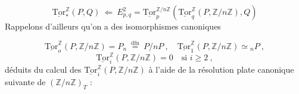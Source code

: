\begin{equation}\tag{2.1.4}
\underline{\mathrm{Tor}}^{\mathbb{Z}}_*(P,Q) \ \Longleftarrow \ E^2_{p,q} = \underline{\mathrm{Tor}}^{\mathbb{Z}/n\mathbb{Z}}_p(\underline{\mathrm{Tor}}^{\mathbb{Z}}_q(P,\mathbb{Z}/n\mathbb{Z}),Q)
\end{equation}
Rappelons d'ailleurs qu'on a des isomorphismes canoniques

\begin{equation*}
\underline{\mathrm{Tor}}^{\mathbb{Z}}_o(P,\mathbb{Z}/n\mathbb{Z}) = P_n \ \overset{\mathrm{dfn}}{=} \ P/nP \ , \quad \underline{\mathrm{Tor}}^{\mathbb{Z}}_1(P,\mathbb{Z}/n\mathbb{Z}) \simeq {}_nP \ ,
\end{equation*}
\begin{equation*}
\underline{\mathrm{Tor}}^{\mathbb{Z}}_i(P,\mathbb{Z}/n\mathbb{Z}) = 0 \quad \text{si } i \geq 2 \ ,
\end{equation*}
déduits du calcul des $\underline{\mathrm{Tor}}^{\mathbb{Z}}_i(P,\mathbb{Z}/n\mathbb{Z})$ à l'aide de la résolution plate canonique suivante de $(\mathbb{Z}/n\mathbb{Z})_T$ :

\begin{center}
\end{center}

